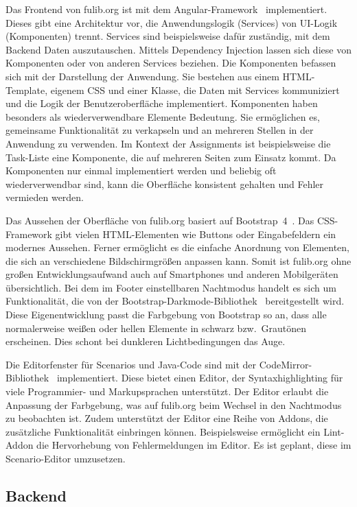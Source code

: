 Das Frontend von fulib.org ist mit dem Angular-Framework~\cite{angular} implementiert.
Dieses gibt eine Architektur vor, die Anwendungslogik (Services) von UI-Logik (Komponenten) trennt.
Services sind beispielsweise dafür zuständig, mit dem Backend Daten auszutauschen.
Mittels Dependency Injection lassen sich diese von Komponenten oder von anderen Services beziehen.
Die Komponenten befassen sich mit der Darstellung der Anwendung.
Sie bestehen aus einem HTML-Template, eigenem CSS und einer Klasse, die Daten mit Services kommuniziert und die Logik der Benutzeroberfläche implementiert.
Komponenten haben besonders als wiederverwendbare Elemente Bedeutung.
Sie ermöglichen es, gemeinsame Funktionalität zu verkapseln und an mehreren Stellen in der Anwendung zu verwenden.
Im Kontext der Assignments ist beispielsweise die Task-Liste eine Komponente, die auf mehreren Seiten zum Einsatz kommt.
Da Komponenten nur einmal implementiert werden und beliebig oft wiederverwendbar sind, kann die Oberfläche konsistent gehalten und Fehler vermieden werden.

Das Aussehen der Oberfläche von fulib.org basiert auf Bootstrap~4~\cite{bootstrap}.
Das CSS-Framework gibt vielen HTML-Elementen wie Buttons oder Eingabefeldern ein modernes Aussehen.
Ferner ermöglicht es die einfache Anordnung von Elementen, die sich an verschiedene Bildschirmgrößen anpassen kann.
Somit ist fulib.org ohne großen Entwicklungsaufwand auch auf Smartphones und anderen Mobilgeräten übersichtlich.
Bei dem im Footer einstellbaren Nachtmodus handelt es sich um Funktionalität, die von der Bootstrap-Darkmode-Bibliothek~\cite{bootstrap-darkmode} bereitgestellt wird.
Diese Eigenentwicklung passt die Farbgebung von Bootstrap so an, dass alle normalerweise weißen oder hellen Elemente in schwarz bzw.\ Grautönen erscheinen.
Dies schont bei dunkleren Lichtbedingungen das Auge.

Die Editorfenster für Scenarios und Java-Code sind mit der CodeMirror-Bibliothek~\cite{codemirror} implementiert.
Diese bietet einen Editor, der Syntaxhighlighting für viele Programmier- und Markupsprachen unterstützt.
Der Editor erlaubt die Anpassung der Farbgebung, was auf fulib.org beim Wechsel in den Nachtmodus zu beobachten ist.
Zudem unterstützt der Editor eine Reihe von Addons, die zusätzliche Funktionalität einbringen können.
Beispielsweise ermöglicht ein Lint-Addon die Hervorhebung von Fehlermeldungen im Editor.
Es ist geplant, diese im Scenario-Editor umzusetzen.

\subsection{Backend}\label{subsec:backend}

